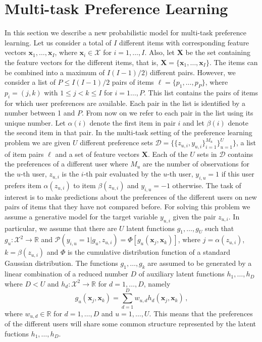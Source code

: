 \section{Multi-task Preference Learning \label{sec:model}}

In this section we describe a new probabilistic model for multi-task preference learning.
Let us consider a total of $I$ different items with corresponding feature vectors $\mathbf{x}_1,\ldots,\mathbf{x}_I$,
where $\mathbf{x}_i\in \mathcal{X}$ for $i = 1,\ldots,I$. 
Also, let $\mathbf{X}$ be the set containing the feature vectors for the different items, that is, $\mathbf{X} = \{\mathbf{x}_1,\ldots,\mathbf{x}_I\}$.
The items can be combined into a maximum of $I(I-1)/2)$ different pairs. However, we
consider a list of $P\leq I(I-1)/2$ pairs of items $\ell = \{ p_1,\ldots,p_P \}$, where $p_i = (j, k)$ with $1\leq j < k \leq I$ for $i = 1\ldots,P$.
This list contains the pairs of items for which user preferences are available.
Each pair in the list is identified by a number between 1 and $P$. From now on we refer to each pair in the list using its unique number.
Let $\alpha(i)$ denote the first item in pair $i$ and let $\beta(i)$ denote the second item in that pair.
In the multi-task setting of the preference learning problem we are given
$U$ different preference sets $\mathcal{D}=\{\{z_{u,i},y_{u,i}\}_{i=1}^{M_u}\}_{u=1}^{U}\}$,
a list of item pairs $\ell$ and a set of feature vectors $\mathbf{X}$.
Each of the $U$ sets in $\mathcal{D}$ contains the preferences of a different user
where $M_u$ are the number of observations for the $u$-th user, $z_{u,i}$ is
the $i$-th pair evaluated by the $u$-th user, $y_{i,u}=1$ if this user
prefers item $\alpha(z_{u,i})$ to item $\beta(z_{u,i})$ and $y_{i,u}=-1$ otherwise.
The task of interest is to make predictions about the preferences of
the different users on new pairs of items that they have not compared before. 
For solving this problem we assume a generative
model for the target variable $y_{u,i}$ given the pair $z_{u,i}$.
In particular, we assume that there are $U$ latent functions
$g_{1},\ldots,g_{U}$ such that $g_u:\mathcal{X}^{2}\rightarrow\mathcal{\mathbb{R}}$
and $\mathcal{P}(y_{i,u}=1|g_u,z_{u,i})=\Phi[g_{u}(\mathbf{x}_j, \mathbf{x}_k)]$,
where $j=\alpha(z_{u,i})$, $k=\beta(z_{u,i})$ and $\Phi$ is the cumulative distribution function of a standard Gaussian distribution.
The functions $g_{1},\dots,g_{k}$ are assumed to be generated by a linear combination of a reduced number $D$ of
auxiliary latent functions $h_{1},\ldots,h_{D}$ where $D<U$ and $h_d:\mathcal{X}^{2}\rightarrow\mathcal{\mathbb{R}}$
for $d=1,\ldots,D$, namely
\begin{equation}
g_{u}(\mathbf{x}_j,\mathbf{x}_k)=\sum_{d=1}^{D}w_{u,d}h_{d}(\mathbf{x}_j,\mathbf{x}_k)\,,\label{eq:expressionG}
\end{equation}
where $w_{u,d}\in \mathbb{R}$ for $d=1,\ldots,D$ and $u = 1,\ldots,U$.
This means that the preferences of the different users will share
some common structure represented by the latent fuctions $h_{1},\ldots,h_{D}$.

